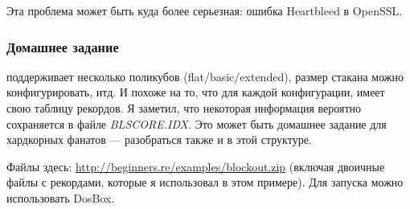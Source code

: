 Эта проблема может быть куда более серьезная: ошибка Heartbleed
в OpenSSL.

\subsubsection{Домашнее задание}

 поддерживает несколько поликубов (flat/basic/extended), размер стакана можно конфигурировать, итд.
И похоже на то, что для каждой конфигурации,  имеет свою таблицу рекордов.
Я заметил, что некоторая информация вероятно сохраняется в файле \emph{BLSCORE.IDX}.
Это может быть домашнее задание для хардкорных фанатов  --- разобраться также и в этой структуре.

Файлы  здесь: \url{http://beginners.re/examples/blockout.zip}
(включая двоичные файлы с рекордами, которые я использовал в этом примере).
Для запуска можно использовать DosBox.

